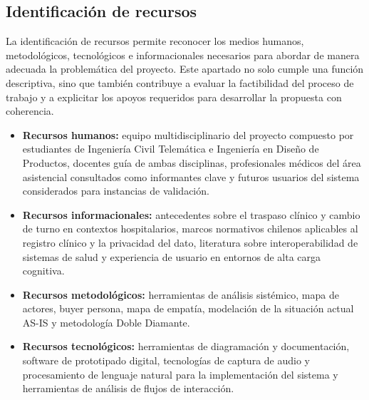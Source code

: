 
\subsection{Identificación de recursos}
La identificación de recursos permite reconocer los medios humanos, metodológicos, tecnológicos e informacionales necesarios para abordar de manera adecuada la problemática del proyecto. Este apartado no solo cumple una función descriptiva, sino que también contribuye a evaluar la factibilidad del proceso de trabajo y a explicitar los apoyos requeridos para desarrollar la propuesta con coherencia.

\begin{itemize}
    \item \textbf{Recursos humanos:} equipo multidisciplinario del proyecto compuesto por estudiantes de Ingeniería Civil Telemática e Ingeniería en Diseño de Productos, docentes guía de ambas disciplinas, profesionales médicos del área asistencial consultados como informantes clave y futuros usuarios del sistema considerados para instancias de validación.

    \item \textbf{Recursos informacionales:} antecedentes sobre el traspaso clínico y cambio de turno en contextos hospitalarios, marcos normativos chilenos aplicables al registro clínico y la privacidad del dato, literatura sobre interoperabilidad de sistemas de salud y experiencia de usuario en entornos de alta carga cognitiva.

    \item \textbf{Recursos metodológicos:} herramientas de análisis sistémico, mapa de actores, buyer persona, mapa de empatía, modelación de la situación actual AS-IS y metodología Doble Diamante.

    \item \textbf{Recursos tecnológicos:} herramientas de diagramación y documentación, software de prototipado digital, tecnologías de captura de audio y procesamiento de lenguaje natural para la implementación del sistema y herramientas de análisis de flujos de interacción.
\end{itemize}
